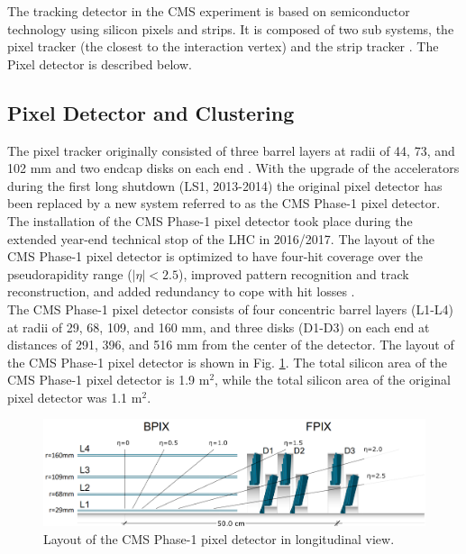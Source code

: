 The tracking detector in the CMS experiment is based on semiconductor technology using silicon pixels and strips. It is composed of two sub systems, the pixel tracker (the closest to the interaction vertex) and the  strip tracker \cite{CMS_Exp_2008}. The Pixel detector is described below. 

\subsection{Pixel Detector and Clustering}
\label{pixel_clust_reco}
The pixel tracker originally consisted of three barrel layers at radii of 44, 73, and 102 mm and two endcap disks on each end \cite{CMS_Exp_2008}. With the upgrade of the accelerators during the first long shutdown (LS1, 2013-2014) the original pixel detector has been replaced by a new system referred to as the CMS Phase-1 pixel detector. The installation of the CMS Phase-1 pixel detector took place during the extended year-end technical stop of the LHC in 2016/2017. The layout of the CMS Phase-1 pixel detector is optimized to have four-hit coverage over the pseudorapidity range ($|\eta|<2.5$), improved pattern recognition and track reconstruction, and added redundancy to cope with hit losses \cite{phase1_Pixel_Detector}. \\
The CMS Phase-1 pixel detector consists of four concentric barrel layers (L1-L4) at radii of 29, 68, 109, and 160 mm, and three disks (D1-D3) on each end at distances of 291, 396, and 516 mm from the center of the detector. The layout of the CMS Phase-1 pixel detector is shown  in Fig. \ref{phase1_pixel_detector}. The total silicon area of the CMS Phase-1 pixel detector is 1.9 $\text{m}^{2}$, while the total silicon area of the original pixel detector was 1.1 $\text{m}^{2}$.

\begin{center}
  \begin{figure}[ht]
    \centering
    \includegraphics[scale=.26]{Chapter2/phase1_PixelDetector.png}
    \caption[CMS Phase-1 pixel detector]{Layout of the CMS Phase-1 pixel detector in longitudinal view\cite{phase1_Pixel_Detector}.}
    \label{phase1_pixel_detector}
  \end{figure}
\end{center}


